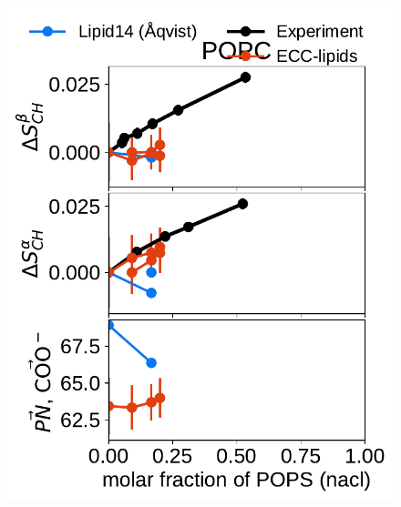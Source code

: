 \documentclass[journal=jpcbfk,manuscript=article]{achemso}
\newlength{\figwidth}
\newlength{\figwidthsmall}
\begin{document}
\begin{figure}[htb!] 
  \centering 
  \includegraphics[width=\figwidthsmall]{../Fig/order_parameters_changes_A-B_PC-PS_mix_POPC_nacl.pdf} 

\end{figure}
\end{document}
